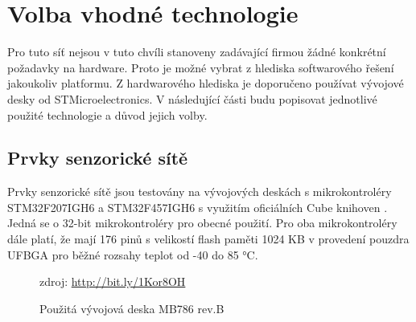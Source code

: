 \chapter{Volba vhodné technologie}
Pro tuto síť nejsou v tuto chvíli stanoveny zadávající firmou žádné konkrétní požadavky na hardware. Proto je možné vybrat z hlediska softwarového řešení jakoukoliv platformu. Z hardwarového hlediska je doporučeno používat vývojové desky od STMicroelectronics.  V následující části budu popisovat jednotlivé použité technologie a důvod jejich volby.

\section{Prvky senzorické sítě}
Prvky senzorické sítě jsou testovány na vývojových deskách s mikrokontroléry STM32F207IGH6 a STM32F457IGH6 s využitím oficiálních Cube knihoven \cite{cube}. Jedná se o 32-bit mikrokontroléry pro obecné použití. Pro oba mikrokontroléry dále platí, že mají 176 pinů s velikostí flash paměti 1024 KB v provedení pouzdra UFBGA pro běžné rozsahy teplot od -40 do 85 °C. 

\begin{figure}[h]
    \centering
	\caption{Použitá vývojová deska MB786 rev.B}
	\small zdroj: \url{http://bit.ly/1Kor8OH}
	\label{fig:eval-board}
\end{figure}

